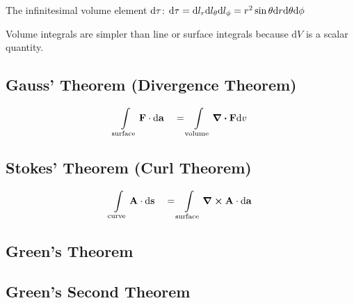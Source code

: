 The infinitesimal volume element $\differential \tau$:
$\differential \tau = \differential l_r \differential l_\theta \differential l_\phi = r^2 \sin \theta \differential r \differential \theta \differential \phi$

Volume integrals are simpler than line or surface integrals because $\mathrm{d}V$ is a scalar quantity.

\subsection*{Gauss' Theorem (Divergence Theorem)}
\begin{equation*}
    \int\limits_{\mathrm{surface}} \mathbf{F} \cdot \differential \mathbf{a} \quad = \int\limits_{\mathrm{volume}} \divergence \mathbf{F} \differential v
\end{equation*}
\subsection*{Stokes' Theorem (Curl Theorem)}
\begin{equation*}
    \int\limits_{\mathrm{curve}} \mathbf{A} \cdot \differential \mathbf{s} \quad = \int\limits_{\mathrm{surface}} \curl \mathbf{A} \cdot \differential \mathbf{a}
\end{equation*}
\subsection*{Green's Theorem}
\subsection*{Green's Second Theorem}